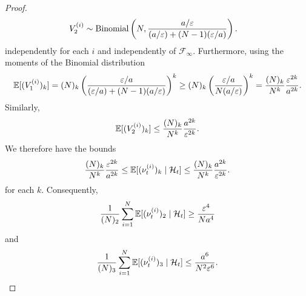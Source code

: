 \begin{proof}
\begin{align*}
& V_2^{(i)} 
\sim \operatorname{Binomial}\left( N, \frac{a/\varepsilon}{(a/\varepsilon) + (N-1)(\varepsilon/a)} \right) .
\end{align*}
independently for each $i$ and independently of $\mathcal{F}_\infty$.
Furthermore, using the moments of the Binomial distribution \parencite[see for example][p. 67]{mosimann1962}
\begin{equation*}
\mathbb{E}[ (V_1^{(i)})_k ]
= (N)_k \left( \frac{ \varepsilon/a }{ (\varepsilon/a) + (N-1)(a/\varepsilon) } \right)^k
\geq (N)_k \left( \frac{ \varepsilon/a }{ N(a/\varepsilon) } \right)^k
= \frac{(N)_k}{N^k} \frac{\varepsilon^{2k}}{a^{2k}} .
\end{equation*}
Similarly, 
\begin{equation*}
\mathbb{E}[ (V_2^{(i)})_k ]
\leq \frac{(N)_k}{N^k} \frac{a^{2k}}{\varepsilon^{2k}} .
\end{equation*}
We therefore have the bounds
\begin{equation*}
\frac{(N)_k}{N^k} \frac{\varepsilon^{2k}}{a^{2k}}
\leq \E[ (\nu_t^{(i)})_k \mid \mathcal{H}_t ]
\leq \frac{(N)_k}{N^k} \frac{a^{2k}}{\varepsilon^{2k}} . %
\end{equation*}
for each $k$. Consequently,
\begin{equation}
\frac{1}{(N)_2} \sum_{i=1}^N \mathbb{E}[ (\nu_t^{(i)})_2 \mid \mathcal{H}_t ]
\geq \frac{\varepsilon^4}{Na^4} \label{eq:mn_cN_LB}
\end{equation}
and
\begin{equation}
\frac{1}{(N)_3} \sum_{i=1}^N \mathbb{E}[ (\nu_t^{(i)})_3 \mid \mathcal{H}_t ]
\leq \frac{a^6}{N^2 \varepsilon^6} . \label{eq:mn_cN3_UB}
\end{equation}
%
%

\end{proof}
